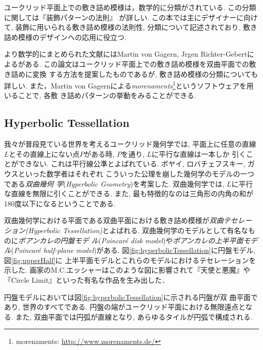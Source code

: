 ユークリッド平面上での敷き詰め模様は，数学的に分類がされている.
この分類に関しては『装飾パターンの法則』
\cite{fujitaｰ201507pattern}が詳しい.
この本では主にデザイナーに向けて, 装飾に用いられる敷き詰め模様の法則性,
分類について記述されており, 敷き詰め模様のデザインへの応用に役立つ.

より数学的にまとめられた文献にはMartin von Gagern, Jrgen
Richter-Gebertによる\cite{journals/combinatorics/GagernR09}がある.
この論文はユークリッド平面上での敷き詰め模様を双曲平面での敷き詰めに変換
する方法を提案したものであるが, 敷き詰め模様の分類についても詳しい.
また，Martin von Gagernによる\emph{morenaments}\footnote{morenaments:
\url{http://www.morenaments.de/}}というソフトウェアを用いることで, 各敷
き詰めパターンの挙動をみることができる.

\subsection{Hyperbolic Tessellation}

我々が普段見ている世界を考えるユークリッド幾何学では, 平面上に任意の直線
$L$とその直線上にない点$P$がある時, $P$を通り, $L$に平行な直線は一本しか
引くことができない.
これは平行線公準とよばれている.
ボヤイ, ロバチェフスキー, ガウスといった数学者はそれぞれ
こういった公理を崩した幾何学のモデルの一つである\emph{双曲幾何
学}(\textit{Hyperbolic Geometry})を考案した.
双曲幾何学では, $L$に平行な直線を無限に引くことができる.
また, 最も特徴的なのは三角形の内角の和が180度以下になるということである.

双曲幾何学における平面である双曲平面における敷き詰め模様が\emph{双曲テセレー
ション}{\it (Hyperbolic Tessellation)}とよばれる.
双曲幾何学のモデルとして有名なものに\emph{ポアンカレの円盤モデ
ル}(\textit{Poincar\'e disk model})や\emph{ポアンカレの上半平面モデ
ル}(\textit{Poincar\'e half-plane model})がある.
図\ref{fig:hyperbolicTessellation}に円盤モデル, 図\ref{fig:upperHalf}に
上半平面モデルとこれらのモデルにおけるテセレーションを示した.
画家のM.C.エッシャーはこのような図に影響されて『天使と悪魔』や『Circle
Limit』といった有名な作品を生み出した．

円盤モデルにおいては図\ref{fig:hyperbolicTessellation}に示される円盤が双
曲平面であり, 世界のすべてである.
円盤の端がユークリッド平面における無限遠点となる.
また, 双曲平面では円弧が直線となり, あらゆるタイルが円弧で構成される.

